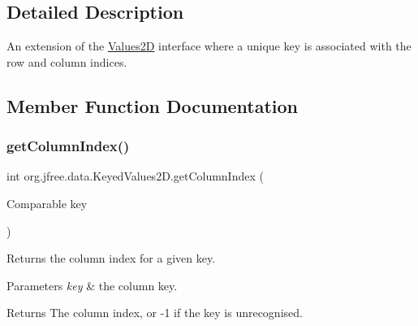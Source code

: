 \subsection{Detailed Description}
An extension of the \mbox{\hyperlink{interfaceorg_1_1jfree_1_1data_1_1_values2_d}{Values2D}} interface where a unique key is associated with the row and column indices. 

\subsection{Member Function Documentation}
\mbox{\label{interfaceorg_1_1jfree_1_1data_1_1_keyed_values2_d_a3360f2f612f16e8c90409d65e3992d38}} 
\subsubsection{\texorpdfstring{get\+Column\+Index()}{getColumnIndex()}}
{\footnotesize\ttfamily int org.\+jfree.\+data.\+Keyed\+Values2\+D.\+get\+Column\+Index (\begin{DoxyParamCaption}\item[{Comparable}]{key }\end{DoxyParamCaption})}

Returns the column index for a given key.


\begin{DoxyParams}{Parameters}
{\em key} & the column key.\\
\hline
\end{DoxyParams}
\begin{DoxyReturn}{Returns}
The column index, or {\ttfamily -\/1} if the key is unrecognised. 
\end{DoxyReturn}


